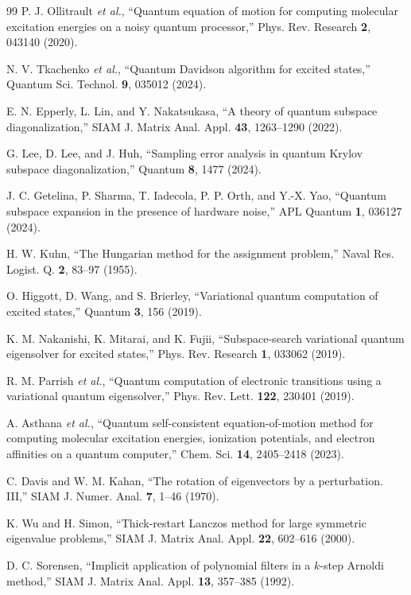 \documentclass[
  reprint,
  amsmath,
  amssymb,
  aps,
  pra,
  nofootinbib,
  superscriptaddress,
  floatfix
]{revtex4-2}
\begin{document}
\begin{thebibliography}{99}
P. J. Ollitrault \textit{et al.},
``Quantum equation of motion for computing molecular excitation energies on a noisy quantum processor,''
Phys. Rev. Research \textbf{2}, 043140 (2020).

N. V. Tkachenko \textit{et al.},
``Quantum Davidson algorithm for excited states,''
Quantum Sci. Technol. \textbf{9}, 035012 (2024).

E. N. Epperly, L. Lin, and Y. Nakatsukasa,
``A theory of quantum subspace diagonalization,''
SIAM J. Matrix Anal. Appl. \textbf{43}, 1263--1290 (2022).

G. Lee, D. Lee, and J. Huh,
``Sampling error analysis in quantum Krylov subspace diagonalization,''
Quantum \textbf{8}, 1477 (2024).

J. C. Getelina, P. Sharma, T. Iadecola, P. P. Orth, and Y.-X. Yao,
``Quantum subspace expansion in the presence of hardware noise,''
APL Quantum \textbf{1}, 036127 (2024).

H. W. Kuhn,
``The Hungarian method for the assignment problem,''
Naval Res. Logist. Q. \textbf{2}, 83--97 (1955).

O. Higgott, D. Wang, and S. Brierley,
``Variational quantum computation of excited states,''
Quantum \textbf{3}, 156 (2019).

K. M. Nakanishi, K. Mitarai, and K. Fujii,
``Subspace-search variational quantum eigensolver for excited states,''
Phys. Rev. Research \textbf{1}, 033062 (2019).

R. M. Parrish \textit{et al.},
``Quantum computation of electronic transitions using a variational quantum eigensolver,''
Phys. Rev. Lett. \textbf{122}, 230401 (2019).

A. Asthana \textit{et al.},
``Quantum self-consistent equation-of-motion method for computing molecular excitation energies, ionization potentials, and electron affinities on a quantum computer,''
Chem. Sci. \textbf{14}, 2405--2418 (2023).

C. Davis and W. M. Kahan,
``The rotation of eigenvectors by a perturbation. III,''
SIAM J. Numer. Anal. \textbf{7}, 1--46 (1970).

K. Wu and H. Simon,
``Thick-restart Lanczos method for large symmetric eigenvalue problems,''
SIAM J. Matrix Anal. Appl. \textbf{22}, 602--616 (2000).

D. C. Sorensen,
``Implicit application of polynomial filters in a $k$-step Arnoldi method,''
SIAM J. Matrix Anal. Appl. \textbf{13}, 357--385 (1992).

\end{thebibliography}
\end{document}
